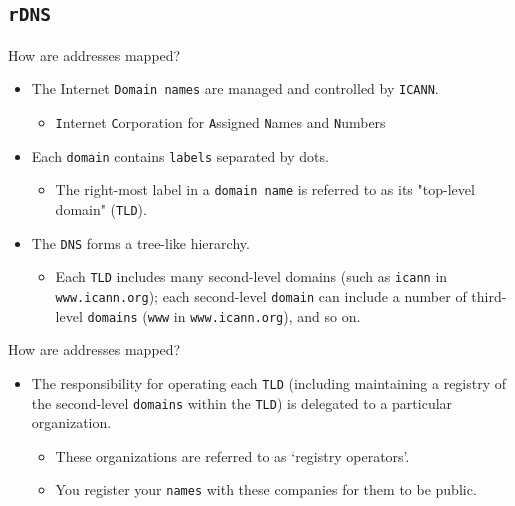 \documentclass[xcolor=table,aspectratio=169]{beamer}
\begin{document}
\subsection{\texttt{rDNS}}
\begin{frame}{How are addresses mapped?}
  \begin{itemize}
    \item The Internet \texttt{Domain names} are managed and controlled by \texttt{ICANN}.
      \begin{itemize}
        \item \texttt{I}nternet \texttt{C}orporation for \texttt{A}ssigned \texttt{N}ames and \texttt{N}umbers
      \end{itemize}
    \item Each \texttt{domain} contains \texttt{labels} separated by dots.
      \begin{itemize}
        \item The right-most label in a \texttt{domain name} is referred to as its "top-level domain" (\texttt{TLD}).
      \end{itemize}
    \item The \texttt{DNS} forms a tree-like hierarchy. 
      \begin{itemize}
        \item Each \texttt{TLD} includes many second-level domains (such as \texttt{icann} in \texttt{www.icann.org}); each second-level \texttt{domain} can include a number of third-level \texttt{domains} (\texttt{www} in \texttt{www.icann.org}), and so on.
      \end{itemize}
  \end{itemize}
\end{frame}

\begin{frame}{How are addresses mapped?}
  \begin{itemize}
    \item The responsibility for operating each \texttt{TLD} (including maintaining a registry of the second-level \texttt{domains} within the \texttt{TLD}) is delegated to a particular organization. 
      \begin{itemize}
        \item These organizations are referred to as `registry operators'.
        \item You register your \texttt{names} with these companies for them to be public.
      \end{itemize}
  \end{itemize}
\end{frame}
\end{document}
